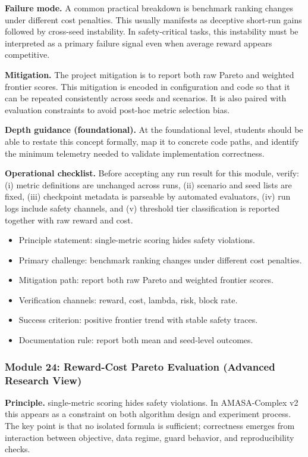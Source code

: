 \documentclass[conference]{IEEEtran}
\begin{document}
\textbf{Failure mode.} A common practical breakdown is benchmark ranking changes under different cost penalties. This usually manifests as deceptive short-run gains followed by cross-seed instability. In safety-critical tasks, this instability must be interpreted as a primary failure signal even when average reward appears competitive.

\textbf{Mitigation.} The project mitigation is to report both raw Pareto and weighted frontier scores. This mitigation is encoded in configuration and code so that it can be repeated consistently across seeds and scenarios. It is also paired with evaluation constraints to avoid post-hoc metric selection bias.

\textbf{Depth guidance (foundational).} At the foundational level, students should be able to restate this concept formally, map it to concrete code paths, and identify the minimum telemetry needed to validate implementation correctness.

\textbf{Operational checklist.} Before accepting any run result for this module, verify: (i) metric definitions are unchanged across runs, (ii) scenario and seed lists are fixed, (iii) checkpoint metadata is parseable by automated evaluators, (iv) run logs include safety channels, and (v) threshold tier classification is reported together with raw reward and cost.

\begin{itemize}[leftmargin=*]
  \item Principle statement: single-metric scoring hides safety violations.
  \item Primary challenge: benchmark ranking changes under different cost penalties.
  \item Mitigation path: report both raw Pareto and weighted frontier scores.
  \item Verification channels: reward, cost, lambda, risk, block rate.
  \item Success criterion: positive frontier trend with stable safety traces.
  \item Documentation rule: report both mean and seed-level outcomes.
\end{itemize}


\subsubsection{Module 24: Reward-Cost Pareto Evaluation (Advanced Research View)}
\textbf{Principle.} single-metric scoring hides safety violations. In AMASA-Complex v2 this appears as a constraint on both algorithm design and experiment process. The key point is that no isolated formula is sufficient; correctness emerges from interaction between objective, data regime, guard behavior, and reproducibility checks.
\end{document}
